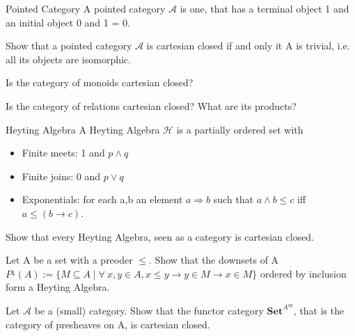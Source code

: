 \begin{definition}{Pointed Category}
  A pointed category $\mathcal{A}$ is one, that has a terminal object 1 and an initial object 0 and 1 = 0.
\end{definition}

\begin{exercise}
  Show that a pointed category $\mathcal{A}$ is cartesian closed if and only it A is trivial, i.e. all its objects are isomorphic.
\end{exercise}

\begin{exercise}
  Is the category of monoids cartesian closed?
\end{exercise}

\begin{exercise}
  Is the category of relations cartesian closed? What are its products?
\end{exercise}

\begin{definition}{Heyting Algebra}
  A Heyting Algebra $\mathcal{H}$ is a partially ordered set with
  \begin{itemize}
  \item Finite meets: 1 and $p\land q$
  \item Finite joins: 0 and $p \lor q$
  \item Exponentials: for each a,b an element $a \Rightarrow b$ such that $a \land b \leq c$ iff $a \leq (b \rightarrow c)$.
  \end{itemize}
\end{definition}

\begin{exercise}
  Show that every Heyting Algebra, seen as a category is cartesian closed.  
\end{exercise}


\begin{exercise}
  Let A be a set with a preoder $\le$. Show that the downsets of A $P^{\downarrow}(A) := \{M \subseteq A \mid \forall \ x,y \in A, x \leq y \rightarrow y \in M \rightarrow x \in M \}$ ordered by inclusion form a Heyting Algebra.
\end{exercise}

\begin{exercise}
  Let $\mathcal{A}$ be a (small) category. Show that the functor category $\textbf{Set}^{A^{op}}$, that is the category of presheaves on A, is cartesian closed. 
\end{exercise}

